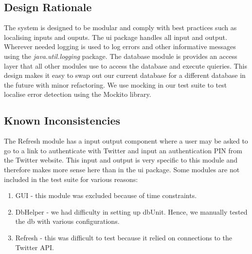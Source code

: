 \documentclass[a4paper, 12pt]{article}
\begin{document}
\subsection{Design Rationale} \label{sec:rationale}
\begin{adjustwidth}{2em}{0pt}
The system is designed to be modular and comply with best practices such as localising inputs and ouputs. The ui package handles all input and output. Wherever needed logging is used to log errors and other informative messages using the \textit{java.util.logging} package. The database module is provides an access layer that all other modules use to access the database and execute quieries. This design makes it easy to swap out our current database for a different database in the future with minor refactoring. We use mocking in our test suite to test localise error detection using the Mockito library.
\end{adjustwidth}

\subsection{Known Inconsistencies} \label{sec:known}
\begin{adjustwidth}{2em}{0pt}
The Refresh module has a input output component where a user may be asked to go to a link to authenticate with Twitter and input an authentication PIN from the Twitter website. This input and output is very specific to this module and therefore makes more sense here than in the ui package.
Some modules are not included in the test suite for various reasons: 
\begin{enumerate}
\item GUI - this module was excluded because of time constraints.
\item DbHelper - we had difficulty in setting up dbUnit. Hence, we manually tested the db with various configurations.
\item Refresh - this was difficult to test because it relied on connections to the Twitter API.
\end{enumerate}
\end{adjustwidth}
\end{document}
